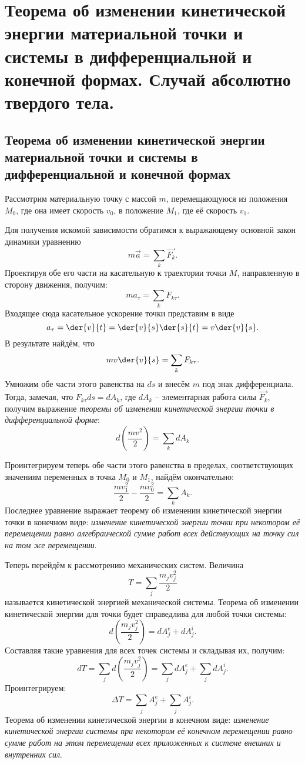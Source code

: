 \chapter{Теорема об изменении кинетической энергии материальной точки и системы
в дифференциальной и конечной формах. Случай абсолютно твердого тела.}

\section{Теорема об изменении кинетической энергии материальной точки и системы
в дифференциальной и конечной формах}

Рассмотрим материальную точку с массой \( m \), перемещающуюся из положения
\( M_0 \), где она имеет скорость \( v_0 \), в положение \( M_1 \), где её
скорость \( v_1 \).

Для получения искомой зависимости обратимся к выражающему основной закон
динамики уравнению
\[
	m\vec{a} = \sum_k \vec{F_k}.
\]
Проектируя обе его части на касательную к траектории точки \( M \),
направленную в сторону движения, получим:
\[
    ma_\tau = \sum_k F_{k\tau}.
\]
Входящее сюда касательное ускорение точки представим в виде
\[
    a_\tau = \der{v}{t} = \der{v}{s}\der{s}{t} = v\der{v}{s}.
\]
В результате найдём, что
\[
    mv\der{v}{s} = \sum_k F_{k\tau}.
\]
Умножим обе части этого равенства на \( ds \) и внесём \( m \) под знак 
дифференциала. Тогда, замечая, что \( F_{k\tau}ds = dA_k \), где 
\( dA_k \) -- элементарная работа силы \( \vec{F_k} \), получим выражение 
\emph{теоремы об изменении кинетической энергии точки в дифференциальной 
форме}:
\[
    d\left( \frac{mv^2}{2} \right) = \sum_k dA_k
\]

Проинтегрируем теперь обе части этого равенства в пределах, соответствующих 
значениям переменных в точка \( M_0 \) и \( M_1 \), найдём окончательно:
\[
    \frac{mv^2_1}{2} - \frac{mv^2_0}{2} = \sum_k A_k.
\]
Последнее уравнение выражает теорему об изменении кинетической 
энергии точки в конечном виде: \emph{изменение кинетической энергии точки при 
некотором её перемещении равно алгебраической сумме работ всех действующих 
на точку сил на том же перемещении}.

Теперь перейдём к рассмотрению механических систем. Величина
\[
	T = \sum_j \frac{m_jv_j^2}{2}
\]
называется кинетической энергией механической системы. Теорема об изменении
кинетической энергии для точки будет справедлива для любой точки системы:
\[
    d\left(\frac{m_j v_j^2}{2}\right) = dA^e_j + dA^i_j.
\]
Составляя такие уравнения для всех точек системы и складывая их, получим:
\[
    dT = \sum_j d\left(\frac{m_jv_j^2}{2}\right) =
    \sum_j dA^e_j + \sum_j dA^i_j.
\]
Проинтегрируем:
\[ 
	\Delta T = \sum_j A^e_j + \sum_j A^i_j.
\]
Теорема об изменении кинетической энергии в конечном виде: 
\emph{изменение кинетической энергии системы при некотором её 
конечном перемещении равно сумме работ на этом перемещении всех 
приложенных к системе внешних и внутренних сил}.

